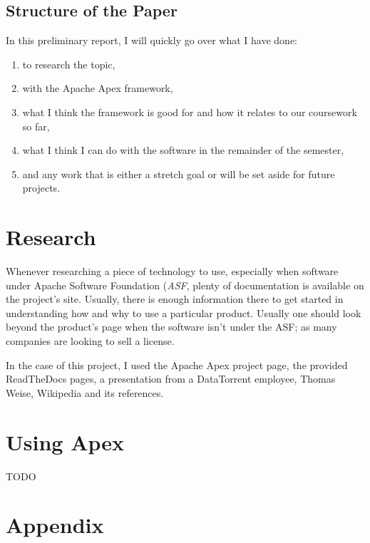 \documentclass[11 pt]{IEEEtran}
\begin{document}
\subsection{Structure of the Paper}
In this preliminary report, I will quickly go over what I have done:
\begin{enumerate}
\item to research the topic,
\item with the Apache Apex framework,
\item what I think the framework is good for and how it relates to our coursework so far,
\item what I think I can do with the software in the remainder of the semester,
\item and any work that is either a stretch goal or will be set aside for future projects.
\end{enumerate}
 

\section{Research}
Whenever researching a piece of technology to use, especially when software under Apache Software Foundation (\emph{ASF}, plenty of documentation is available on the project's site. Usually, there is enough information there to get started in understanding how and why to use a particular product. Usually one should look beyond the product's page when the software isn't under the ASF; as many companies are looking to sell a license.

In the case of this project, I used the Apache Apex project page\cite{APEX}, the provided ReadTheDocs pages\cite{APEXrtd_dt}\cite{APEXrtd_apache}\cite{MALHAR}, a presentation from a DataTorrent employee, Thomas Weise\cite{WEISE}, Wikipedia and its references\cite{WIKI}\cite{DATANAMI}.
 
 \section{Using Apex}
TODO


\newpage
\section{Appendix}
 
\end{document}
